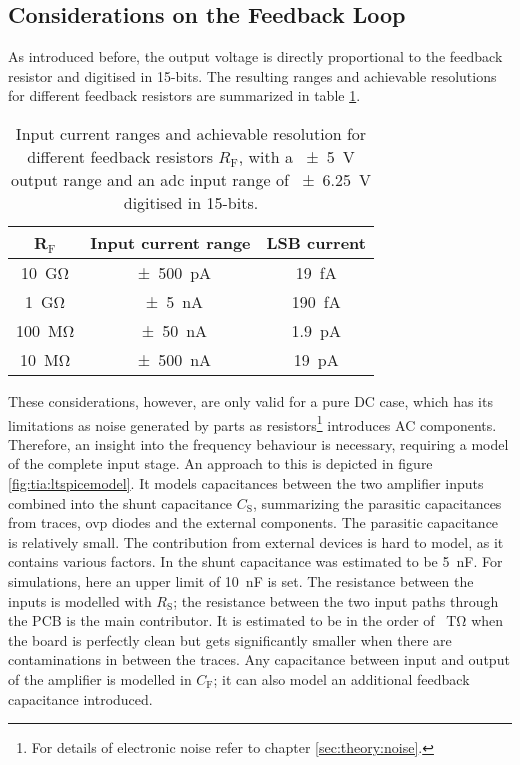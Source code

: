 \subsection*{Considerations on the Feedback Loop}
As introduced before, the output voltage is directly proportional to the feedback resistor and digitised in 15-bits. The resulting ranges and achievable resolutions for different feedback resistors are summarized in table \ref{tab:tia:RF}.
\begin{table}
	\centering
	\begin{tabular}{ccc}\hline
		R$_\text{F}$ & Input current range & LSB current \\\hline
		\SI{10}{\giga\ohm} & \SI{\pm500}{\pico\ampere} & \SI{19}{\femto\ampere}\\
		\SI{1}{\giga\ohm} & \SI{\pm5}{\nano\ampere} & \SI{190}{\femto\ampere}\\
		\SI{100}{\mega\ohm} & \SI{\pm50}{\nano\ampere} & \SI{1.9}{\pico\ampere}\\
		\SI{10}{\mega\ohm} & \SI{\pm500}{\nano\ampere} & \SI{19}{\pico\ampere}\\\hline
	\end{tabular}
\caption{Input current ranges and achievable resolution for different feedback resistors $R_\text{F}$, with a \SI{\pm5}{\volt} output range and an \ac{adc} input range of \SI{\pm6.25}{\volt} digitised in 15-bits.}
\label{tab:tia:RF}
\end{table}
These considerations, however, are only valid for a pure DC case, which has its limitations as noise generated by parts as resistors\footnote{For details of electronic noise refer to chapter \ref{sec:theory:noise}.} introduces AC components. Therefore, an insight into the frequency behaviour is necessary, requiring a model of the complete input stage. An approach to this is depicted in figure \ref{fig:tia:ltspicemodel}. It models capacitances between the two amplifier inputs combined into the shunt capacitance $C_\text{S}$, summarizing the parasitic capacitances from traces, \ac{ovp} diodes and the external components. The parasitic capacitance is relatively small. The contribution from external devices is hard to model, as it contains various factors. In \cite{zagreb} the shunt capacitance was estimated to be \SI{5}{\nano\farad}. For simulations, here an upper limit of \SI{10}{\nano\farad} is set.  The resistance between the inputs is modelled with $R_\text{S}$; the resistance between the two input paths through the PCB is the main contributor. It is estimated to be in the order of \SI{}{\tera\ohm} when the board is perfectly clean but gets significantly smaller when there are contaminations in between the traces. Any capacitance between input and output of the amplifier is modelled in $C_\text{F}$; it can also model an additional feedback capacitance introduced.
